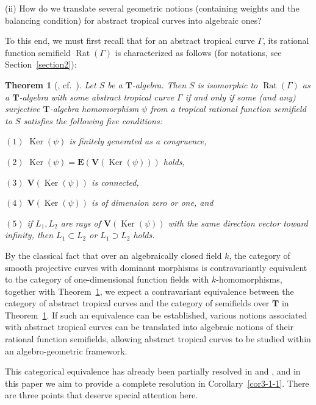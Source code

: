 \documentclass[a4paper,12pt]{amsart}
\newtheorem{thm}[dfn]{Theorem}
\def\Gamma{\varGamma}
\begin{document}
(ii) How do we translate several geometric notions (containing weights and the balancing condition) for abstract tropical curves into algebraic ones?

To this end, we must first recall that for an abstract tropical curve $\Gamma$, its rational function semifield $\operatorname{Rat}(\Gamma)$ is characterized as follows (for notations, see Section~\ref{section2}):

\begin{thm}[{\cite[Corollary~3.19]{JuAe5}, cf.~\cite[Section~3]{JuAe=Nakajima}}]
	\label{thm1-1}
Let $S$ be a $\boldsymbol{T}$-algebra.
Then $S$ is isomorphic to $\operatorname{Rat}(\Gamma)$ as a $\boldsymbol{T}$-algebra with some abstract tropical curve $\Gamma$ if and only if some (and any) surjective $\boldsymbol{T}$-algebra homomorphism $\psi$ from a tropical rational function semifield to $S$ satisfies the following five conditions:

$(1)$ $\operatorname{Ker}(\psi)$ is finitely generated as a congruence,

$(2)$ $\operatorname{Ker}(\psi) = \boldsymbol{E}(\boldsymbol{V}(\operatorname{Ker}(\psi)))$ holds,

$(3)$ $\boldsymbol{V}(\operatorname{Ker}(\psi))$ is connected,

$(4)$ $\boldsymbol{V}(\operatorname{Ker}(\psi))$ is of dimension zero or one, and

$(5)$ if $L_1, L_2$ are rays of $\boldsymbol{V}(\operatorname{Ker}(\psi))$ with the same direction vector toward infinity, then $L_1 \subset L_2$ or $L_1 \supset L_2$ holds.
\end{thm}

By the classical fact that over an algebraically closed field $k$, the category of smooth projective curves with dominant morphisms is contravariantly equivalent to the category of one-dimensional function fields with $k$-homomorphisms, together with Theorem~\ref{thm1-1}, we expect a contravariant equivalence between the category of abstract tropical curves and the category of semifields over $\boldsymbol{T}$ in Theorem~\ref{thm1-1}.
If such an equivalence can be established, various notions associated with abstract tropical curves can be translated into algebraic notions of their rational function semifields, allowing abstract tropical curves to be studied within an algebro-geometric framework.

This categorical equivalence has already been partially resolved in \cite[Corollary~3.20]{JuAe5} and \cite[Section~3]{JuAe=Nakajima}, and in this paper we aim to provide a complete resolution in Corollary~\ref{cor3-1-1}.
There are three points that deserve special attention here.
\end{document}
